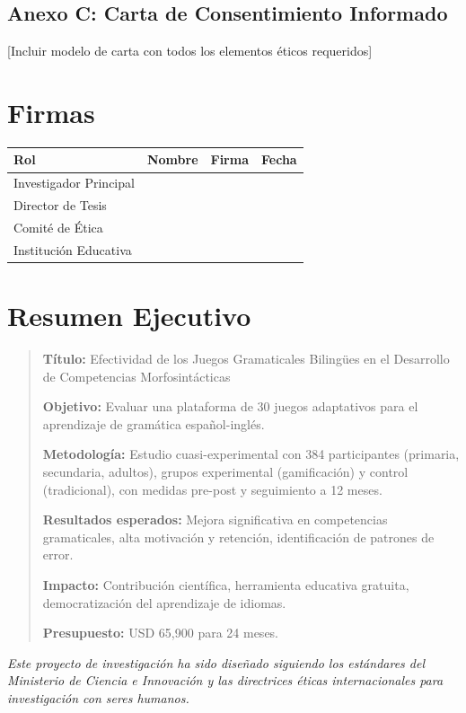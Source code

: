 \documentclass[12pt,a4paper]{article}
\begin{document}
\subsection{Anexo C: Carta de Consentimiento Informado}

[Incluir modelo de carta con todos los elementos éticos requeridos]

\section{Firmas}

\begin{table}[H]
\centering
\begin{tabular}{|l|l|l|l|}
\hline
\textbf{Rol} & \textbf{Nombre} & \textbf{Firma} & \textbf{Fecha} \\
\hline
Investigador Principal & & & \\
Director de Tesis & & & \\
Comité de Ética & & & \\
Institución Educativa & & & \\
\hline
\end{tabular}
\end{table}

\section{Resumen Ejecutivo}

\begin{quote}
\textbf{Título:} Efectividad de los Juegos Gramaticales Bilingües en el Desarrollo de Competencias Morfosintácticas

\textbf{Objetivo:} Evaluar una plataforma de 30 juegos adaptativos para el aprendizaje de gramática español-inglés.

\textbf{Metodología:} Estudio cuasi-experimental con 384 participantes (primaria, secundaria, adultos), grupos experimental (gamificación) y control (tradicional), con medidas pre-post y seguimiento a 12 meses.

\textbf{Resultados esperados:} Mejora significativa en competencias gramaticales, alta motivación y retención, identificación de patrones de error.

\textbf{Impacto:} Contribución científica, herramienta educativa gratuita, democratización del aprendizaje de idiomas.

\textbf{Presupuesto:} USD 65,900 para 24 meses.
\end{quote}

\textit{Este proyecto de investigación ha sido diseñado siguiendo los estándares del Ministerio de Ciencia e Innovación y las directrices éticas internacionales para investigación con seres humanos.}
\end{document}
